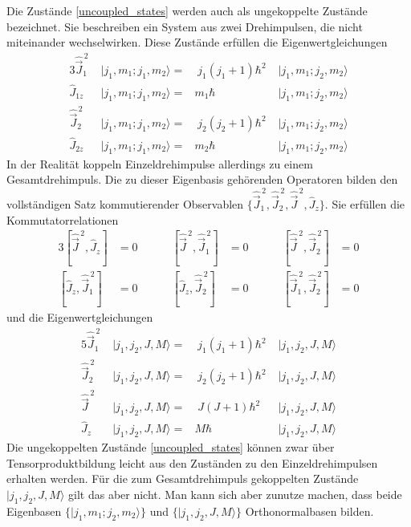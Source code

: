 \documentclass[9pt]{report}
\begin{document}
Die Zustände \eqref{uncoupled_states} werden auch als ungekoppelte Zustände bezeichnet. Sie beschreiben ein System aus zwei Drehimpulsen, die nicht miteinander wechselwirken. Diese Zustände erfüllen die Eigenwertgleichungen
\begin{alignat*}{3}
\hat{\vec{J}}_{1}^{\,2}\; & \big|j_1,m_1;j_1,m_2\big\rangle = & \;j_1(j_1+1)\hbar^2\; & \big|j_1,m_1;j_2,m_2\big\rangle \\
\hat{J}_{1z} & \big|j_1,m_1;j_1,m_2\big\rangle = & m_1\hbar\; & \big|j_1,m_1;j_2,m_2\big\rangle \\
\hat{\vec{J}}_{2}^{\,2}\; & \big|j_1,m_1;j_1,m_2\big\rangle = & \;j_2(j_2+1)\hbar^2\; & \big|j_1,m_1;j_2,m_2\big\rangle \\
\hat{J}_{2z} & \big|j_1,m_1;j_1,m_2\big\rangle = & m_2\hbar\; & \big|j_1,m_1;j_2,m_2\big\rangle
\end{alignat*}
In der Realität koppeln Einzeldrehimpulse allerdings zu einem Gesamtdrehimpuls. Die zu dieser Eigenbasis gehörenden Operatoren bilden den vollständigen Satz kommutierender Observablen $\{\hat{\vec{J}}_{1}^{\,2},\hat{\vec{J}}_{2}^{\,2},\hat{\vec{J}}^{\,2},\hat{J}_{z}\}$. Sie erfüllen die Kommutatorrelationen
\begin{alignat*}{3}
[\hat{\vec{J}}^{\,2},\hat{J}_{z}] &= 0\qquad\quad
[\hat{\vec{J}}^{\,2},\hat{\vec{J}}_{1}^{\,2}] &= 0\qquad\quad
[\hat{\vec{J}}^{\,2},\hat{\vec{J}}_{2}^{\,2}] &= 0\\
[\hat{J}_{z},\hat{\vec{J}}_{1}^{\,2}] &= 0\qquad\quad
[\hat{J}_{z},\hat{\vec{J}}_{2}^{\,2}] &= 0\qquad\quad
[\hat{\vec{J}}_{1}^{\,2},\hat{\vec{J}}_{2}^{\,2}] &= 0
\end{alignat*}
und die Eigenwertgleichungen
\begin{alignat*}{5}
\hat{\vec{J}}_{1}^{\,2}\; & \big|j_1,j_2,J,M\big\rangle = & \;j_1(j_1+1)\hbar^2\; & \big|j_1,j_2,J,M\big\rangle \\
\hat{\vec{J}}_{2}^{\,2}\; & \big|j_1,j_2,J,M\big\rangle = & \;j_2(j_2+1)\hbar^2\; & \big|j_1,j_2,J,M\big\rangle \\
\hat{\vec{J}}^{\,2}\; & \big|j_1,j_2,J,M\big\rangle = & \;J(J+1)\hbar^2\; & \big|j_1,j_2,J,M\big\rangle \\
\hat{J}_{z}\; & \big|j_1,j_2,J,M\big\rangle = & M\hbar\; & \big|j_1,j_2,J,M\big\rangle
\end{alignat*}
Die ungekoppelten Zustände \eqref{uncoupled_states} können zwar über Tensorproduktbildung leicht aus den Zuständen zu den Einzeldrehimpulsen erhalten werden. Für die zum Gesamtdrehimpuls gekoppelten Zustände $\big|j_1,j_2,J,M\big\rangle$ gilt das aber nicht. Man kann sich aber zunutze machen, dass beide Eigenbasen $\{\big|j_1,m_1;j_2,m_2\big\rangle\}$ und $\{\big|j_1,j_2,J,M\big\rangle\}$ Orthonormalbasen bilden.
\end{document}
